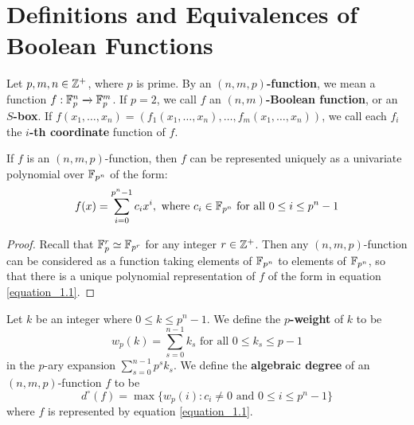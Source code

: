 \section{Definitions and Equivalences of Boolean Functions}\label{section_1.1}

\begin{definition}
  Let $p,m, n \in \mathbb{Z}^+$, where $p$ is prime. By an \textbf{$(n,m,p)$-function},
  we mean a function $f:\mathbb{F}_p^n \xrightarrow{} \mathbb{F}_p^m$. If $p=2$, we call $f$ an
  \textbf{$(n,m)$-Boolean function}, or an \textbf{$S$-box}. If
  $f(x_1, \dots, x_n)=(f_1(x_1, \dots, x_n), \dots, f_m(x_1, \dots, x_n))$, we
  call each $f_i$ the \textbf{$i$-th coordinate} function of $f$.
\end{definition}

\begin{lemma}\label{lemma_1.1.1}
  If $f$ is an  $(n,m,p)$-function, then $f$ can be represented uniquely as a
  univariate polynomial over  $\mathbb{F}_{p^n}$ of the form:
  \begin{equation}\label{equation_1.1}
    f(x)=\sum_{i=0}^{p^n-1}{c_ix^i},  \text{ where } c_i \in \mathbb{F}_{p^n}
    \text{ for all } 0 \leq i \leq p^n-1
  \end{equation}
\end{lemma}
\begin{proof}
  Recall that $\mathbb{F}_p^r \simeq \mathbb{F}_{p^r}$ for any integer $r \in \mathbb{Z}^+$. Then any
  $(n,m,p)$-function can be considered as a function taking elements of
  $\mathbb{F}_{p^n}$ to elements of $\mathbb{F}_{p^n}$, so that there is a unique polynomial
  representation of $f$ of the form in equation \ref{equation_1.1}.
\end{proof}

\begin{defintion}
  Let $k$ be an integer where $0 \leq k \leq p^n-1$. We define the
  \textbf{$p$-weight} of $k$ to be
  \begin{equation}\label{equation_1.2}
    w_p(k)=\sum_{s=0}^{n-1}{k_s} \text{ for all } 0 \leq k_s \leq p-1
  \end{equation}
  in the $p$-ary expansion  $\sum_{s=0}^{n-1}{p^sk_s}$. We define the
  \textbf{algebraic degree} of an $(n,m,p)$-function $f$ to be
  \begin{equation}\label{equation_2.3}
    d^\circ(f)=\max{\{w_p(i) : c_i \neq 0 \text{ and } 0 \leq i \leq p^n-1\}}
  \end{equation}
  where $f$ is represented by equation \ref{equation_1.1}.
\end{defintion}

